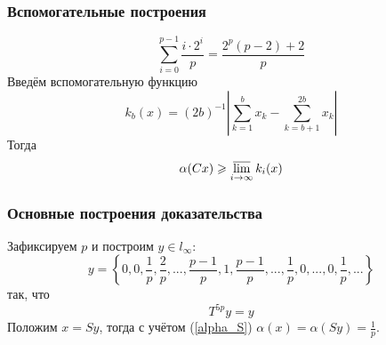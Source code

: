 \documentclass[10pt,pdf,hyperref={unicode}]{beamer}
\begin{document}
\begin{frame}\frametitle{Вспомогательные построения}

	\begin{equation}\label{summa_drobey}
		\sum_{i=0}^{p-1} \frac{i \cdot 2^i}{p} = \frac{2^p(p-2) + 2}{p}
	\end{equation}
	Введём вспомогательную функцию
	\begin{equation*}\label{def_k_b}
		k_b(x) = (2b)^{-1} \left|
			\sum_{k=1}^{b}x_k - \sum_{k=b+1}^{2b}x_k
		\right|
	\end{equation*}
	Тогда
	\begin{equation}\label{alpha_greater_k_b}
		\alpha (Cx) \geqslant \varlimsup_{i\to \infty} k_i(x)
	\end{equation}

\end{frame}

\begin{frame}\frametitle{Основные построения доказательства}
	Зафиксируем $p$ и построим $y\in l_\infty$:
	\begin{equation*}\label{y_construction}
		y = \left\{
			0, 0, \frac{1}{p}, \frac{2}{p}, %
			...,
			\frac{p-1}{p}, 1, \frac{p-1}{p},
			...,
			\frac{1}{p},
			0, ..., 0,
			\frac{1}{p}, ...
		\right\}
	\end{equation*}
	так, что
	\begin{equation}\label{T_y}
		T^{5p}y = y
	\end{equation}
	Положим $x = Sy$, тогда с учётом (\ref{alpha_S})
	$
		\alpha (x) = \alpha (Sy) = \frac{1}{p}
	$.	
\end{frame}
\end{document}
